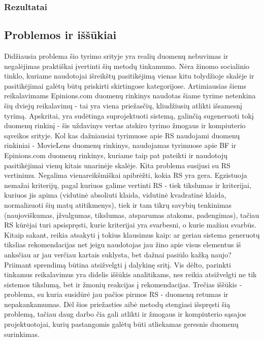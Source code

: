 \documentclass{VUMIFInfMagistrinis}
\begin{document}
\subsubsection{Rezultatai}
\subsection{Problemos ir iššūkiai}
\indent
Didžiausia problema šio tyrimo srityje yra realių duomenų nebuvimas ir negalėjimas praktiškai įvertinti šių metodų tinkamumo. Nėra žinomo socialinio tinklo, kuriame naudotojai išreikštų pasitikėjimą vienas kitu tolydžioje skalėje ir pasitikėjimai galėtų būtų priskirti skirtingose kategorijose. Artimiausias šiems reikalavimams Epinions.com duomenų rinkinys naudotas šiame tyrime netenkina šių dviejų reikalavimų - tai yra viena priežasčių, kliudžiusių atlikti išsamesnį tyrimą. Apskritai, yra sudėtinga suprojektuoti sistemą, galinčią sugeneruoti tokį duomenų rinkinį - šis uždavinys vertas atskiro tyrimo žmogaus ir kompiuterio sąveikos srityje. Kol kas dažniausiai tyrimuose apie RS naudojami duomenų rinkiniai - MovieLens duomenų rinkinys, naudojamas tyrimuose apie BF ir Epinions.com duomenų rinkinys, kuriame taip pat pateikti ir naudotojų pasitikėjimai vienų kitais unarinėje skalėje.
\newline
\indent
Kita problema susijusi su RS vertinimu. Negalima vienareikšmiškai apibrėžti, kokia RS yra gera. Egzistuoja nemažai kriterijų, pagal kuriuos galime vertinti RS - tiek tikslumas ir kriterijai, kuriuos jis apima (vidutinė absoliuti klaida, vidutinė kvadratinė klaida, normalizuoti šių matų atitikmenys), tiek ir tam tikrų savybių tenkinimas (naujoviškumas, įžvalgumas, tikslumas, atsparumas atakoms, padengimas), tačiau RS kūrėjai turi apsispręsti, kurie kriterijai yra svarbesni, o kurie mažiau svarbūs. Kitaip sakant, reikia atsakyti į tokius klausimus kaip: ar geriau sistema generuotų tikslias rekomendacijas net jeigu naudotojas jau žino apie visus elementus iš anksčiau ar jau verčiau kartais suklysta, bet dažnai pasiūlo kažką naujo? Priimant sprendimą būtina atsižvelgti į dalykinę sritį. Vis dėlto, parinkti tinkamus reikalavimus yra didelis iššūkis analitikams, nes reikia atsižvelgti ne tik sistemos tikslumą, bet ir žmonių reakcijas į rekomendacijas.
\newline
\indent
Trečias iššūkis - problema, su kuria susidūrė jau pačios pirmos RS - duomenų retumas ir nepakankamumas. Dėl šios priežasties aibė metodų stengiasi išspręsti šią problemą, tačiau daug darbo čia gali atlikti ir žmogaus ir kompiuterio sąsajos projektuotojai, kurių pastangomis galėtų būti atliekamas geresnis duomenų surinkimas. 
\end{document}
